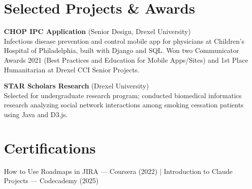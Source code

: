 \documentclass[11pt,letterpaper]{article}
\begin{document}
                                                                                                                \section{Selected Projects \& Awards}
                                                                                                                \textbf{CHOP IPC Application} (Senior Design, Drexel University) \\
                                                                                                                Infectious disease prevention and control mobile app for physicians at Children's Hospital of Philadelphia, built with Django and SQL. Won two Communicator Awards 2021 (Best Practices and Education for Mobile Apps/Sites) and 1st Place Humanitarian at Drexel CCI Senior Projects.
                                                                                                                
                                                                                                                \vspace{4pt}
                                                                                                                \textbf{STAR Scholars Research} (Drexel University) \\
                                                                                                                Selected for undergraduate research program; conducted biomedical informatics research analyzing social network interactions among smoking cessation patients using Java and D3.js.
                                                                                                                
                                                                                                                \section{Certifications}
                                                                                                                How to Use Roadmaps in JIRA --- Coursera (2022) \quad $\mid$ \quad Introduction to Claude Projects --- Codecademy (2025)
                                                                                                                
                                                                                                                
\end{document}
